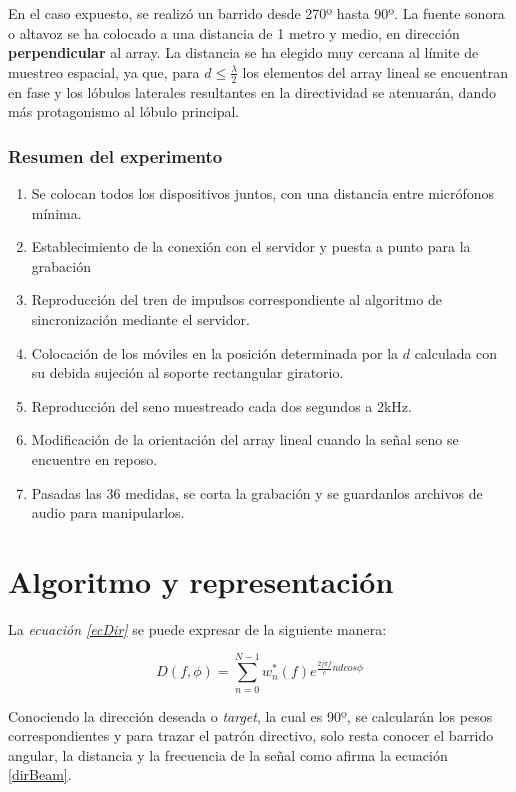 \documentclass[a4paper,11pt]{book}
\begin{document}
 En el caso expuesto, se realizó un barrido desde 270º hasta 90º. La fuente sonora o altavoz se ha colocado a una distancia de 1 metro y medio, en dirección \textbf{perpendicular} al array.
 La distancia se ha elegido muy cercana al límite de muestreo espacial, ya que, para $d \leq \frac{\lambda}{2}$ los elementos del array lineal se encuentran en fase y los lóbulos laterales resultantes en la directividad se atenuarán, dando más protagonismo al lóbulo principal.

\subsubsection{Resumen del experimento}
\begin{enumerate}
\item Se colocan todos los dispositivos juntos, con una distancia entre micrófonos mínima.
\item Establecimiento de la conexión con el servidor y puesta a punto para la grabación
\item Reproducción del tren de impulsos correspondiente al algoritmo de sincronización mediante el servidor.
\item Colocación de los móviles en la posición determinada por la $d$ calculada con su debida sujeción al soporte rectangular giratorio.
\item Reproducción del seno muestreado cada dos segundos a 2kHz.
\item Modificación de la orientación del array lineal cuando la señal seno se encuentre en reposo.
\item Pasadas las 36 medidas, se corta la grabación y se guardanlos archivos de audio para manipularlos. 
\end{enumerate}


\section{Algoritmo y representación}
La \textit{ecuación \ref{ecDir}} se puede expresar de la siguiente manera:

	\begin{equation}
	 D(f, \phi) = \sum_{n = 0}^{N-1}w^{*}_{n}(f)e^{\frac{2j \pi f}{c} n d cos\phi}
	 \label{DirBeam}
	\end{equation}

Conociendo la dirección deseada o \textit{target}, la cual es 90º, se calcularán los pesos correspondientes y para trazar el patrón directivo, solo resta conocer el barrido angular, la distancia y la frecuencia de la señal como afirma la ecuación \ref{dirBeam}.
\end{document}
